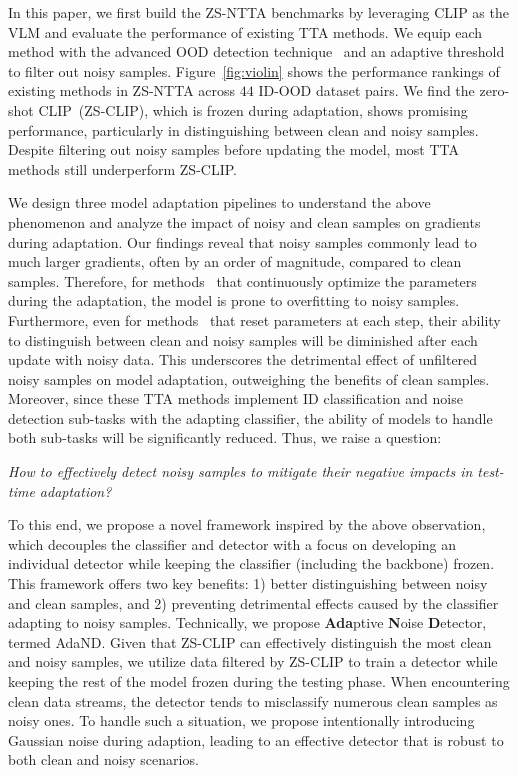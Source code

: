 \vspace{-.15in}
In this paper, we first build the ZS-NTTA benchmarks by leveraging CLIP as the VLM and evaluate the performance of existing TTA methods.
We equip each method with the advanced OOD detection technique~\citep{ming2022delving} and an adaptive threshold to filter out noisy samples.
Figure~\ref{fig:violin} shows the performance rankings of existing methods in ZS-NTTA across $44$ ID-OOD dataset pairs. 
We find the zero-shot CLIP~(ZS-CLIP), which is frozen during adaptation, shows promising performance, particularly in distinguishing between clean and noisy samples. Despite filtering out noisy samples before updating the model, most TTA methods still underperform ZS-CLIP. 

We design three model adaptation pipelines to understand the above phenomenon and analyze the impact of noisy and clean samples on gradients during adaptation.
Our findings reveal that noisy samples commonly lead to much larger gradients, often by an order of magnitude, compared to clean samples. 
Therefore, for methods~\citep{wang2021tent} that continuously optimize the parameters during the adaptation, the model is prone to overfitting to noisy samples.
Furthermore, even for methods~\citep{shu2022test} that reset parameters at each step, their ability to distinguish between clean and noisy samples will be diminished after each update with noisy data.
This underscores the detrimental effect of unfiltered noisy samples on model adaptation, outweighing the benefits of clean samples. 
Moreover, since these TTA methods implement ID classification and noise detection sub-tasks with the adapting classifier, the ability of models to handle both sub-tasks will be significantly reduced.
Thus, we raise a question:
\begin{center}
\textit{How to effectively detect noisy samples to mitigate their negative impacts in test-time adaptation?}
\end{center}
To this end, we propose a novel framework inspired by the above observation, which decouples the classifier and detector with a focus on developing an individual detector while keeping the classifier (including the backbone) frozen. 
This framework offers two key benefits: 1) better distinguishing between noisy and clean samples, and 2) preventing detrimental effects caused by the classifier adapting to noisy samples.
Technically, we propose \textbf{Ada}ptive \textbf{N}oise \textbf{D}etector, termed AdaND. 
Given that ZS-CLIP can effectively distinguish the most clean and noisy samples, we utilize data filtered by ZS-CLIP to train a detector while keeping the rest of the model frozen during the testing phase. 
When encountering clean data streams, the detector tends to misclassify numerous clean samples as noisy ones.
To handle such a situation, we propose intentionally introducing Gaussian noise during adaption, leading to an effective detector that is robust to both clean and noisy scenarios.

